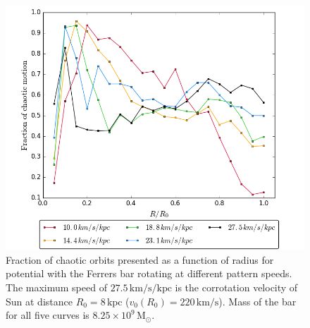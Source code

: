 \documentclass[a4paper,fleqn,usenatbib]{mnras}
\begin{document}
\begin{figure}
	\includegraphics[width=\columnwidth]{all3}
	\caption{Fraction of chaotic orbits presented as a function of radius for potential with the Ferrers bar rotating at different pattern speeds. The maximum speed of $ 27.5\,\mathrm{km/s/kpc} $ is the corrotation velocity of Sun at distance $ R_0 = 8\,\mathrm{kpc} $ ($ v_0(R_0) = 220\,\mathrm{km/s}$). Mass of the bar for all five curves is $ 8.25\times 10^{9}\,\mathrm{M_{\odot}} $.}
	\label{fig:pattern_speed}
\end{figure}





\end{document}
